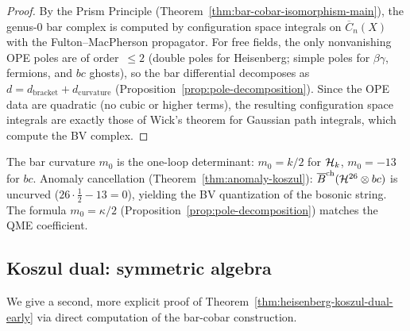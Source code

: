 \begin{proof}
By the Prism Principle (Theorem~\ref{thm:bar-cobar-isomorphism-main}),
the genus-$0$ bar complex is computed by configuration space integrals
on $\overline{C}_n(X)$ with the Fulton--MacPherson propagator.
For free fields, the only nonvanishing OPE poles are of order~$\leq 2$
(double poles for Heisenberg; simple poles for $\beta\gamma$, fermions,
and $bc$ ghosts), so the bar differential decomposes as
$d = d_{\mathrm{bracket}} + d_{\mathrm{curvature}}$
(Proposition~\ref{prop:pole-decomposition}).
Since the OPE data are quadratic (no cubic or higher terms), the
resulting configuration space integrals are exactly those of Wick's theorem
for Gaussian path integrals, which compute the BV complex.
\end{proof}

\begin{remark}
\label{rem:curvature-one-loop}
The bar curvature $m_0$ is the one-loop determinant: $m_0 = k/2$ for $\mathcal{H}_k$, $m_0 = -13$ for $bc$.  Anomaly cancellation (Theorem~\ref{thm:anomaly-koszul}): $\overline{B}^{\mathrm{ch}}(\mathcal{H}^{26} \otimes bc)$ is uncurved ($26 \cdot \tfrac{1}{2} - 13 = 0$), yielding the BV quantization of the bosonic string.  The formula $m_0 = \kappa/2$ (Proposition~\ref{prop:pole-decomposition}) matches the QME coefficient.
\end{remark}



\subsection{Koszul dual: symmetric algebra}

We give a second, more explicit proof of Theorem~\ref{thm:heisenberg-koszul-dual-early} via direct computation of the bar-cobar construction.

